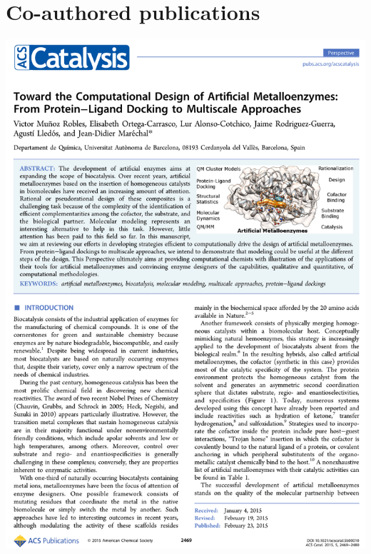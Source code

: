 \chapter*{Co-authored publications}
\clearpage\thispagestyle{empty}\mbox{}\clearpage
\includegraphics[width=\textwidth]{figures/pubs/acscatal.pdf}
\clearpage\thispagestyle{empty}\mbox{}\clearpage
